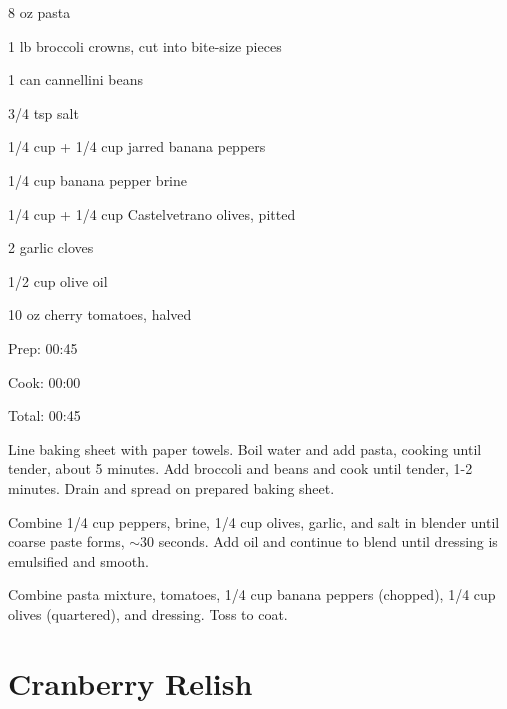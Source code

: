 \documentclass[oneside]{book}  %
\def\thisrecipe{}  %
\newcommand{\recipe}[1]{\section{#1}\def\thisrecipe{: #1}} %
\newcommand{\about}{$\sim$}
\begin{document}
\begin{IT}
  \begin{ingredients}[serves=6]
    \item[8 oz] pasta
    \item[1 lb] broccoli crowns, cut into bite-size pieces
    \item[1 can] cannellini beans
    \item[3/4 tsp] salt
    \item[1/4 cup + 1/4 cup] jarred banana peppers
    \item[1/4 cup] banana pepper brine
    \item[1/4 cup + 1/4 cup] Castelvetrano olives, pitted
    \item[2] garlic cloves
    \item[1/2 cup] olive oil
    \item[10 oz] cherry tomatoes, halved
  \end{ingredients}

  \switchcolumn

  \begin{timeline}
    \item[Prep:]  00:45
    \item[Cook:]  00:00
    \item[Total:] 00:45
  \end{timeline}
\end{IT}

\begin{directions}
  \item Line baking sheet with paper towels. Boil water and add pasta, cooking
  until tender, about 5 minutes. Add broccoli and beans and cook until tender,
  1-2 minutes. Drain and spread on prepared baking sheet.

  \item Combine 1/4 cup peppers, brine, 1/4 cup olives, garlic, and salt in
  blender until coarse paste forms, \about 30 seconds. Add oil and continue to
  blend until dressing is emulsified and smooth.

  \item Combine pasta mixture, tomatoes, 1/4 cup banana peppers (chopped), 1/4
  cup olives (quartered), and dressing. Toss to coat.
\end{directions}
\recipe{Cranberry Relish} \label{recipe:cranberry_relish} %
\end{document}
